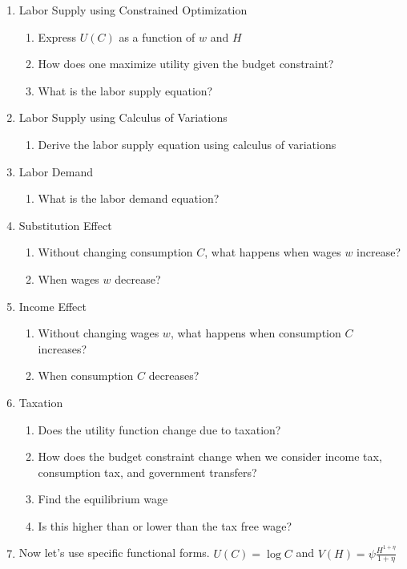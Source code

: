\documentclass[11pt]{scrartcl}
\begin{document}
\begin{enumerate}
\item Labor Supply using Constrained Optimization
\begin{enumerate}
\item Express $U(C)$ as a function of $w$ and $H$
\item How does one maximize utility given the budget constraint?
\item What is the labor supply equation?
\end{enumerate}
\item Labor Supply using Calculus of Variations
\begin{enumerate}
\item Derive the labor supply equation using calculus of variations
\end{enumerate}
\item Labor Demand
\begin{enumerate}
\item What is the labor demand equation?
\end{enumerate}
\item Substitution Effect
\begin{enumerate}
\item Without changing consumption $C$, what happens when wages $w$ increase?
\item When wages $w$ decrease?
\end{enumerate}
\item Income Effect
\begin{enumerate}
\item Without changing wages $w$, what happens when consumption $C$ increases?
\item When consumption $C$ decreases?
\end{enumerate}
\item Taxation
\begin{enumerate}
\item Does the utility function change due to taxation?
\item How does the budget constraint change when we consider income tax, consumption tax, and government transfers?
\item Find the equilibrium wage
\item Is this higher than or lower than the tax free wage?
\end{enumerate}
\item Now let's use specific functional forms. $U(C) = \log{C}$ and $V(H) = \psi \frac{H^{1+\eta}}{1+\eta}$
\begin{enumerate}

\end{enumerate}
\end{enumerate}
\end{document}
